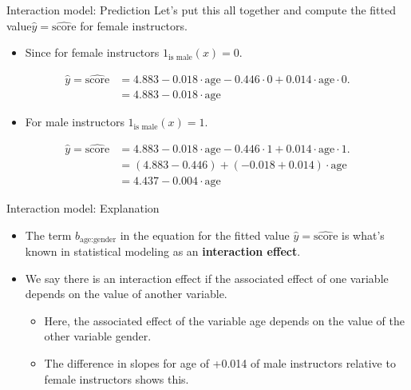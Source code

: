 \documentclass[
  ignorenonframetext,
]{beamer}
\providecommand{\tightlist}{%
  \setlength{\itemsep}{0pt}\setlength{\parskip}{0pt}}
\begin{document}
\begin{frame}{Interaction model: Prediction}
\protect\hypertarget{interaction-model-prediction-1}{}
Let's put this all together and compute the fitted
value\(\hat{y}=\widehat{\text{score}}\) for female instructors.

\begin{itemize}
\tightlist
\item
  Since for female instructors \(1_{\text{is male}}(x)=0\).
\end{itemize}

\[\begin{array}{ll}
\hat{y}=\widehat{\text{score}}&=4.883-0.018\cdot \text{age}-0.446\cdot 0+0.014\cdot \text{age}\cdot 0.\\
&=4.883-0.018\cdot \text{age}
\end{array}\]

\begin{itemize}
\tightlist
\item
  For male instructors \(1_{\text{is male}}(x)=1\).
\end{itemize}

\[\begin{array}{ll}
\hat{y}=\widehat{\text{score}}&=4.883-0.018\cdot \text{age}-0.446\cdot 1+0.014\cdot \text{age}\cdot 1.\\
&=(4.883-0.446)+(-0.018+0.014)\cdot \text{age}\\
&=4.437-0.004\cdot \text{age}
\end{array}\]
\end{frame}

\begin{frame}{Interaction model: Explanation}
\protect\hypertarget{interaction-model-explanation}{}
\begin{itemize}
\item
  The term \(b_{\text{age:gender}}\) in the equation for the fitted
  value \(\hat{y}=\widehat{\text{score}}\) is what's known in
  statistical modeling as an \textbf{interaction effect}.
\item
  We say there is an interaction effect if the associated effect of one
  variable depends on the value of another variable.

  \begin{itemize}
  \tightlist
  \item
    Here, the associated effect of the variable age depends on the value
    of the other variable gender.
  \item
    The difference in slopes for age of +0.014 of male instructors
    relative to female instructors shows this.
  \end{itemize}
\end{itemize}
\end{frame}
\end{document}

